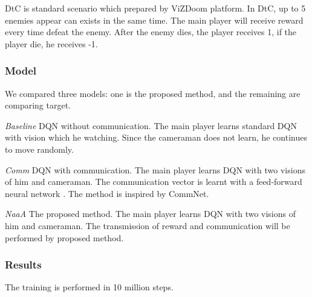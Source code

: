 DtC is standard scenario which prepared by ViZDoom platform.
In DtC, up to 5 enemies appear can exists in the same time. 
The main player will receive reward every time defeat the enemy.
After the enemy dies, the player receives 1, if the player die, he receives -1.

\subsubsection{Model}
We compared three models: one is the proposed method, and the remaining are comparing target.

{\em Baseline} DQN without communication. The main player learns standard DQN with vision which he watching.
Since the cameraman does not learn, he continues to move randomly.

{\em Comm} DQN with communication. The main player learns DQN with two visions of him and cameraman.
The communication vector is learnt with a feed-forward neural network .  The method is inspired by CommNet.

{\em NaaA} The proposed method. The main player learns DQN with two visions of him and cameraman.
The transmission of reward and communication will be performed by proposed method.

\subsubsection{Results}
The training is performed in 10 million steps.

